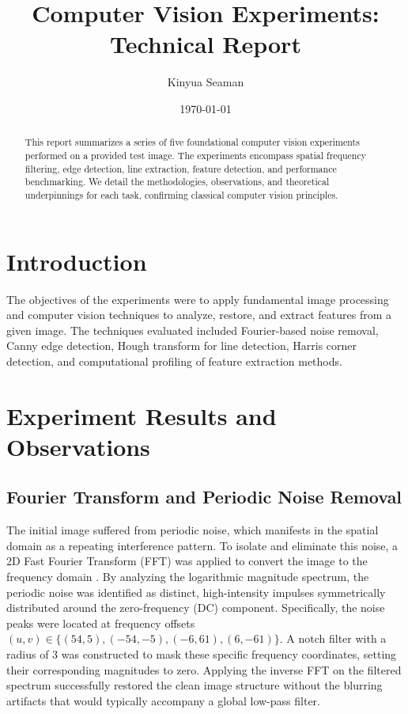 \documentclass[11pt,a4paper]{article}
\title{Computer Vision Experiments: Technical Report}
\author{Kinyua Seaman}
\date{\today}
\begin{document}
\maketitle

\begin{abstract}
This report summarizes a series of five foundational computer vision experiments performed on a provided test image. The experiments encompass spatial frequency filtering, edge detection, line extraction, feature detection, and performance benchmarking. We detail the methodologies, observations, and theoretical underpinnings for each task, confirming classical computer vision principles.
\end{abstract}

\section{Introduction}
The objectives of the experiments were to apply fundamental image processing and computer vision techniques to analyze, restore, and extract features from a given image. The techniques evaluated included Fourier-based noise removal, Canny edge detection, Hough transform for line detection, Harris corner detection, and computational profiling of feature extraction methods.

\section{Experiment Results and Observations}

\subsection{Fourier Transform and Periodic Noise Removal}
The initial image suffered from periodic noise, which manifests in the spatial domain as a repeating interference pattern. To isolate and eliminate this noise, a 2D Fast Fourier Transform (FFT) was applied to convert the image to the frequency domain \cite{gonzalez2018}. By analyzing the logarithmic magnitude spectrum, the periodic noise was identified as distinct, high-intensity impulses symmetrically distributed around the zero-frequency (DC) component. 
Specifically, the noise peaks were located at frequency offsets $(u, v) \in \{(54, 5), (-54, -5), (-6, 61), (6, -61)\}$. A notch filter with a radius of 3 was constructed to mask these specific frequency coordinates, setting their corresponding magnitudes to zero. Applying the inverse FFT on the filtered spectrum successfully restored the clean image structure without the blurring artifacts that would typically accompany a global low-pass filter.
\end{document}
